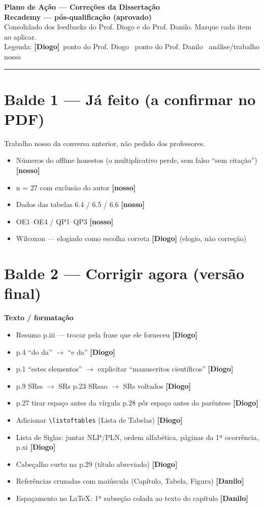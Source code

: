 \documentclass[11pt]{article}
\newcommand{\sub}[1]{\vspace{5pt}\noindent\textbf{\color{muted}#1}\par\vspace{-3pt}}
\newcommand{\tgd}{{\footnotesize\bfseries\color{diogo}[Diogo]}}
\newcommand{\tgn}{{\footnotesize\bfseries\color{danilo}[Danilo]}}
\newcommand{\tgo}{{\footnotesize\bfseries\color{nosso}[nosso]}}
\begin{document}
\begin{center}
{\LARGE\bfseries\color{accent} Plano de Ação — Correções da Dissertação}\\[2pt]
{\large\bfseries Recademy --- pós-qualificação (aprovado)}\\[6pt]
{\small\color{muted} Consolidado dos feedbacks do Prof. Diogo e do Prof. Danilo. Marque cada item ao aplicar.\\
Legenda: \tgd\ ponto do Prof. Diogo \quad \tgn\ ponto do Prof. Danilo \quad \tgo\ análise/trabalho nosso}
\end{center}
\vspace{2pt}\hrule\vspace{4pt}

\section{Balde 1 --- Já feito (a confirmar no PDF)}
{\small\color{muted}Trabalho nosso da conversa anterior, não pedido dos professores.}
\begin{itemize}[label=$\checkmark$,leftmargin=1.5em,itemsep=1pt,topsep=2pt]
\item Números do offline honestos (o multiplicativo perde, sem falso ``sem citação'') \tgo
\item n = 27 com exclusão do autor \tgo
\item Dados das tabelas 6.4 / 6.5 / 6.6 \tgo
\item OE1--OE4 / QP1--QP3 \tgo
\item Wilcoxon --- elogiado como escolha correta \tgd{\footnotesize\color{muted} (elogio, não correção)}
\end{itemize}

\section{Balde 2 --- Corrigir agora (versão final)}

\sub{Texto / formatação}
\begin{itemize}[label=$\square$,leftmargin=1.5em,itemsep=2pt,topsep=2pt]
\item Resumo p.iii --- trocar pela frase que ele forneceu \tgd
\item p.4 ``do da'' $\to$ ``e da'' \tgd
\item p.1 ``estes elementos'' $\to$ explicitar ``manuscritos científicos'' \tgd
\item p.9 SRss $\to$ SRs \quad p.23 SRsao $\to$ SRs voltados \tgd
\item p.27 tirar espaço antes da vírgula \quad p.28 pôr espaço antes do parêntese \tgd
\item Adicionar \texttt{\textbackslash listoftables} (Lista de Tabelas) \tgd
\item Lista de Siglas: juntar NLP/PLN, ordem alfabética, páginas da 1ª ocorrência, p.xi \tgd
\item Cabeçalho curto na p.29 (título abreviado) \tgd
\item Referências cruzadas com maiúscula (Capítulo, Tabela, Figura) \tgn
\item Espaçamento no LaTeX: 1ª subseção colada ao texto do capítulo \tgn
\end{itemize}
\end{document}
